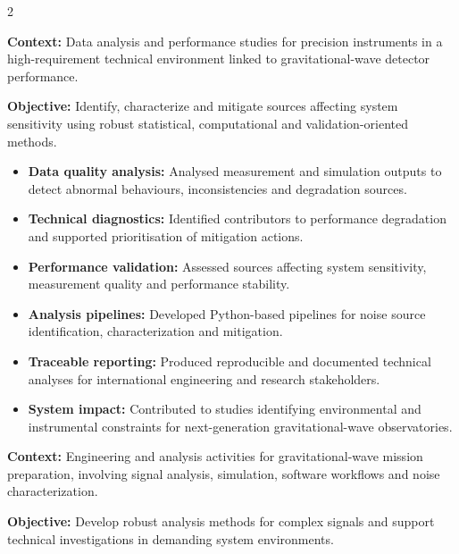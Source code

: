 \documentclass[8pt,a4paper,ragged2e,withhyper]{altacv}
\begin{document}
\begin{paracol}{2}
\divider


\textbf{Context:} Data analysis and performance studies for precision instruments in a high-requirement technical environment linked to gravitational-wave detector performance.

\textbf{Objective:} Identify, characterize and mitigate sources affecting system sensitivity using robust statistical, computational and validation-oriented methods.

\begin{itemize}
  \item \textbf{Data quality analysis:} Analysed measurement and simulation outputs to detect abnormal behaviours, inconsistencies and degradation sources.
  \item \textbf{Technical diagnostics:} Identified contributors to performance degradation and supported prioritisation of mitigation actions.
  \item \textbf{Performance validation:} Assessed sources affecting system sensitivity, measurement quality and performance stability.
  \item \textbf{Analysis pipelines:} Developed Python-based pipelines for noise source identification, characterization and mitigation.
  \item \textbf{Traceable reporting:} Produced reproducible and documented technical analyses for international engineering and research stakeholders.
  \item \textbf{System impact:} Contributed to studies identifying environmental and instrumental constraints for next-generation gravitational-wave observatories.
\end{itemize}

\divider


\textbf{Context:} Engineering and analysis activities for gravitational-wave mission preparation, involving signal analysis, simulation, software workflows and noise characterization.

\textbf{Objective:} Develop robust analysis methods for complex signals and support technical investigations in demanding system environments.


\end{paracol}
\end{document}
